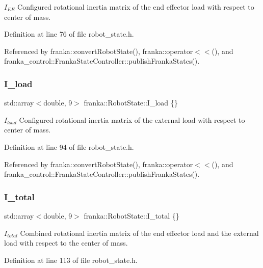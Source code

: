$I_{EE}$ Configured rotational inertia matrix of the end effector load with respect to center of mass. 

Definition at line 76 of file robot\+\_\+state.\+h.



Referenced by franka\+::convert\+Robot\+State(), franka\+::operator$<$$<$(), and franka\+\_\+control\+::\+Franka\+State\+Controller\+::publish\+Franka\+States().

\mbox{\label{structfranka_1_1RobotState_a5b194153497eff98049681f852118f82}} 
\subsubsection{\texorpdfstring{I\+\_\+load}{I\_load}}
{\footnotesize\ttfamily std\+::array$<$double, 9$>$ franka\+::\+Robot\+State\+::\+I\+\_\+load \{\}}

$I_{load}$ Configured rotational inertia matrix of the external load with respect to center of mass. 

Definition at line 94 of file robot\+\_\+state.\+h.



Referenced by franka\+::convert\+Robot\+State(), franka\+::operator$<$$<$(), and franka\+\_\+control\+::\+Franka\+State\+Controller\+::publish\+Franka\+States().

\mbox{\label{structfranka_1_1RobotState_ad9120ae7b7613e77df8c1c3eba8fb033}} 
\subsubsection{\texorpdfstring{I\+\_\+total}{I\_total}}
{\footnotesize\ttfamily std\+::array$<$double, 9$>$ franka\+::\+Robot\+State\+::\+I\+\_\+total \{\}}

$I_{total}$ Combined rotational inertia matrix of the end effector load and the external load with respect to the center of mass. 

Definition at line 113 of file robot\+\_\+state.\+h.



